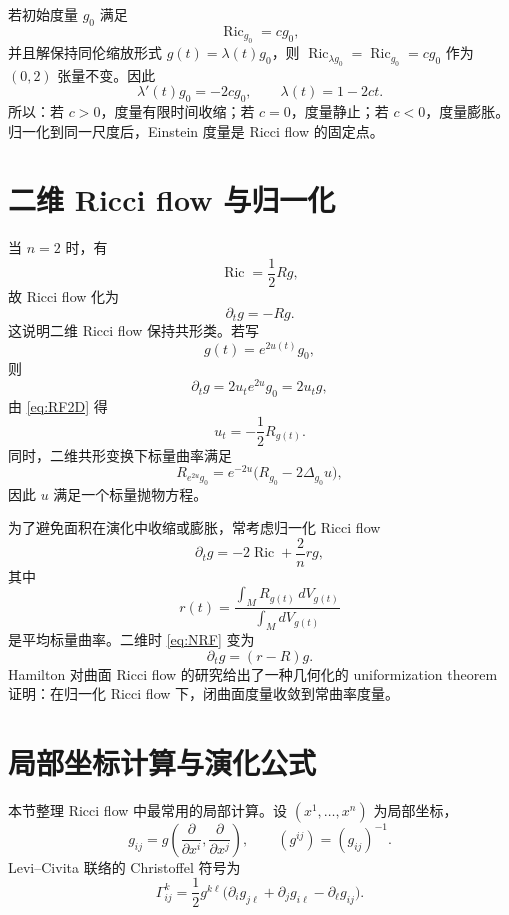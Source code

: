 \documentclass[11pt,a4paper,cn,nofont,math=cm,mode=fancy,bibtex]{elegantbook}
\numberwithin{equation}{chapter}
\numberwithin{figure}{chapter}
\newcommand{\Ric}{\operatorname{Ric}}
\begin{document}
\begin{ex}[Einstein 度量]
若初始度量 $g_0$ 满足
\[
  \Ric_{g_0}=c g_0,
\]
并且解保持同伦缩放形式 $g(t)=\lambda(t)g_0$，则 $\Ric_{\lambda g_0}=\Ric_{g_0}=c g_0$ 作为 $(0,2)$ 张量不变。因此
\[
  \lambda'(t)g_0=-2c g_0,
  \qquad \lambda(t)=1-2ct.
\]
所以：若 $c>0$，度量有限时间收缩；若 $c=0$，度量静止；若 $c<0$，度量膨胀。归一化到同一尺度后，Einstein 度量是 Ricci flow 的固定点。
\end{ex}

\chapter{二维 Ricci flow 与归一化}

当 $n=2$ 时，有
\[
  \Ric=\frac{1}{2}R g,
\]
故 Ricci flow 化为
\begin{equation}\label{eq:RF2D}
  \partial_t g=-R g.
\end{equation}
这说明二维 Ricci flow 保持共形类。若写
\[
  g(t)=e^{2u(t)}g_0,
\]
则
\[
  \partial_t g=2u_t e^{2u}g_0=2u_t g,
\]
由 \eqref{eq:RF2D} 得
\[
  u_t=-\frac{1}{2}R_{g(t)}.
\]
同时，二维共形变换下标量曲率满足
\[
  R_{e^{2u}g_0}=e^{-2u}\bigl(R_{g_0}-2\Delta_{g_0}u\bigr),
\]
因此 $u$ 满足一个标量抛物方程。

为了避免面积在演化中收缩或膨胀，常考虑归一化 Ricci flow
\begin{equation}\label{eq:NRF}
  \partial_t g= -2\Ric + \frac{2}{n}r g,
\end{equation}
其中
\[
  r(t)=\frac{\int_M R_{g(t)}\,dV_{g(t)}}{\int_M dV_{g(t)}}
\]
是平均标量曲率。二维时 \eqref{eq:NRF} 变为
\[
  \partial_t g=(r-R)g.
\]
Hamilton \cite{Hamilton1982} 对曲面 Ricci flow 的研究给出了一种几何化的 uniformization theorem 证明：在归一化 Ricci flow 下，闭曲面度量收敛到常曲率度量。

\chapter{局部坐标计算与演化公式}

本节整理 Ricci flow 中最常用的局部计算。设 $(x^1,\dots,x^n)$ 为局部坐标，
\[
  g_{ij}=g\left(\frac{\partial}{\partial x^i},\frac{\partial}{\partial x^j}\right),
  \qquad (g^{ij})=(g_{ij})^{-1}.
\]
Levi--Civita 联络的 Christoffel 符号为
\begin{equation}\label{eq:Christoffel}
  \Gamma^k_{ij}=\frac12 g^{k\ell}\bigl(\partial_i g_{j\ell}+\partial_j g_{i\ell}-\partial_\ell g_{ij}\bigr).
\end{equation}
\end{document}
